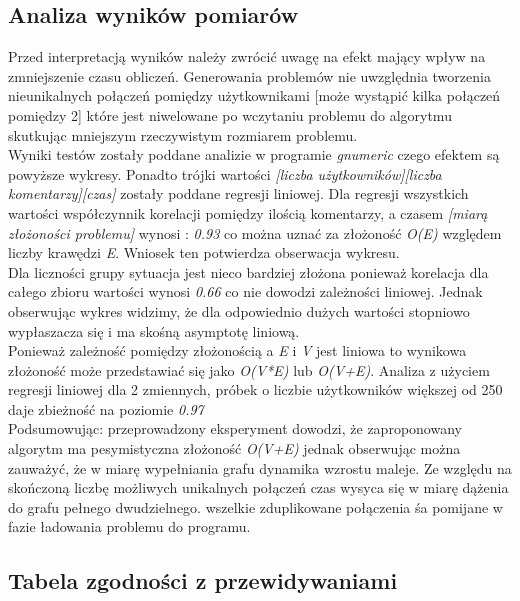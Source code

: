 \documentclass[11pt]{article}
\newcommand{\+}{\discretionary{\mbox{\scriptsize$\hookleftarrow$}}{}{}}
\begin{document}
\subsection{Analiza wyników pomiarów}
Przed interpretacją wyników należy zwrócić uwagę na efekt mający wpływ na zmniejszenie czasu obliczeń. Generowania problemów nie uwzględnia tworzenia nieunikalnych połączeń pomiędzy użytkownikami [może wystąpić kilka połączeń pomiędzy 2] które jest niwelowane po wczytaniu problemu do algorytmu skutkując mniejszym rzeczywistym rozmiarem problemu.
\\
Wyniki testów zostały poddane analizie w programie \textit{gnumeric} czego efektem są powyższe wykresy. Ponadto trójki wartości \textit{[liczba użytkowników][liczba komentarzy][czas]} zostały poddane regresji liniowej. Dla regresji wszystkich wartości współczynnik korelacji pomiędzy ilością komentarzy, a czasem \textit{[miarą złożoności problemu]} wynosi : \textit{0.93} co można uznać za złożoność \textit{O(E)} względem liczby krawędzi \textit{E}. Wniosek ten potwierdza obserwacja wykresu.
\\
Dla liczności grupy sytuacja jest nieco bardziej złożona ponieważ korelacja dla całego zbioru wartości wynosi \textit{0.66} co nie dowodzi zależności liniowej. Jednak  
obserwując wykres widzimy, że dla odpowiednio dużych wartości stopniowo wypłaszacza się i ma skośną asymptotę liniową.
\\
Ponieważ zależność pomiędzy złożonością a \textit{E} i \textit{V} jest liniowa to wynikowa złożoność może przedstawiać się jako \textit{O(V*E)} lub \textit{O(V+E)}. Analiza z użyciem regresji liniowej dla 2 zmiennych, próbek o liczbie użytkowników większej od 250 daje zbieżność na poziomie \textit{0.97} 
\\ 
Podsumowując: przeprowadzony eksperyment dowodzi, że zaproponowany algorytm ma pesymistyczna złożoność \textit{O(V+E)} jednak obserwując można zauważyć, że w miarę wypełniania grafu dynamika wzrostu maleje. Ze względu na skończoną liczbę możliwych unikalnych połączeń czas wysyca się w miarę dążenia do grafu pełnego dwudzielnego. wszelkie zduplikowane połączenia śa pomijane w fazie ładowania problemu do programu.
\subsection{Tabela zgodności z przewidywaniami}
\end{document}
